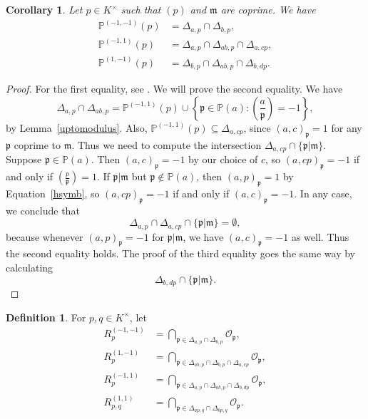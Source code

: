 \documentclass[12pt,reqno]{amsart}
\newcommand{\mm}{\mathfrak{m}}
\newcommand{\OO}{\mathcal{O}}
\newcommand{\pp}{\mathfrak{p}}
\newcommand{\PP}{\mathbb{P}}
\newtheorem{cor}[thm]{Corollary}
\theoremstyle{definition}
\newtheorem{defn}[thm]{Definition}
\begin{document}
\begin{cor}\label{cor3.20}
Let $p\in K^{\times}$ such that $(p)$ and $\mm$ are coprime. We have
\begin{align*}
\PP^{(-1,-1)}(p)&=\Delta_{a,p}\cap\Delta_{b,p}, \\
\PP^{(-1,1)}(p)&=\Delta_{a,p}\cap \Delta_{ab,p}\cap \Delta_{a,cp}, \\
\PP^{(1,-1)}(p)&=\Delta_{b,p}\cap\Delta_{ab,p}\cap \Delta_{b,dp}.
\end{align*}
\end{cor}
\begin{proof}
For the first equality, see \cite[Corollary 3.20]{Park}. We will prove
the second equality. We have 
\[
\Delta_{a,p} \cap \Delta_{ab,p} = \PP^{(-1,1)}(p)\cup \left\{\pp\in
\PP(a): \left(\frac{a}{\pp}\right) = -1\right\}, 
\]
by Lemma~\ref{uptomodulus}. Also, $\PP^{(-1,1)}(p)\subseteq
\Delta_{a,cp}$, since $(a,c)_{\pp}=1$ for any $\pp$ coprime to
$\mm$. Thus we need to compute the intersection $\Delta_{a,cp}\cap
\{\pp|\mm\}$. 
Suppose $\pp\in \PP(a)$. Then $(a,c)_{\pp}=-1$ by
our choice of $c$, so
$(a,cp)_{\pp}=-1$ if and only if $\left(\frac{p}{\pp}\right)=1$. If
$\pp|\mm$ but $\pp\not\in \PP(a)$, then $(a,p)_{\pp}=1$ by Equation~\ref{hsymb}, so
$(a,cp)_{\pp}=-1$ if and only if $(a,c)_{\pp}=-1$. In any case, we
  conclude that 
\[
\Delta_{a,p}\cap\Delta_{a,cp} \cap \{\pp|\mm\} = \emptyset,
\]
because whenever $(a,p)_{\pp}=-1$ for $\pp|\mm$, we have
$(a,c)_{\pp}=-1$ as well. Thus the second equality holds. The proof of the third equality goes
the same way by calculating 
\[
\Delta_{b,dp}\cap\{\pp|\mm\}. 
\]
\end{proof}
\begin{defn}\label{semilocalringsdef}
For $p,q\in K^{\times}$, let
\begin{align*}
R_p^{(-1,-1)} &= \bigcap_{\pp\in \Delta_{a,p}\cap \Delta_{b,p}} \OO_{\pp},\\ 
R_p^{(1,-1)} &= \bigcap_{\pp\in \Delta_{ab,p}\cap \Delta_{b,p}\cap\Delta_{a,cp}} \OO_{\pp}, \\
R_p^{(-1,1)}&= \bigcap_{\pp\in \Delta_{a,p}\cap \Delta_{ab,p}\cap\Delta_{b,dp}} \OO_{\pp}, \\
R_{p,q}^{(1,1)} &= \bigcap_{\pp\in \Delta_{ap,q}\cap \Delta_{bp,q}} \OO_{\pp}.
\end{align*}
\end{defn}

\end{document}
